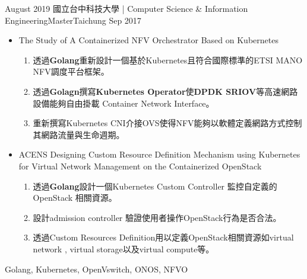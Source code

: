 %
%
%


\begin{experiences}
  \experience
    {August 2019}   {國立台中科技大學 | Computer Science \& Information Engineering}{Master}{Taichung}
    {Sep 2017} {
                      \begin{itemize}
                        \item The Study of A Containerized NFV Orchestrator Based on Kubernetes
                        \begin{enumerate}
                        	\item 透過\textbf{Golang}重新設計一個基於Kubernetes且符合國際標準的ETSI MANO NFV調度平台框架。 
                        	\item 透過\textbf{Golagn}撰寫\textbf{Kubernetes Operator}使\textbf{DPDK SRIOV}等高速網路設備能夠自由掛載 Container Network Interface。
                            \item 重新撰寫Kubernetes CNI介接OVS使得NFV能夠以軟體定義網路方式控制其網路流量與生命週期。
                        \end{enumerate}
                        \item ACENS Designing Custom Resource Definition Mechanism using Kubernetes for
Virtual Network Management on the Containerized OpenStack
                        \begin{enumerate}
                        	\item 透過\textbf{Golang}設計一個Kubernetes Custom Controller 監控自定義的OpenStack 相關資源。
                        	\item 設計admission controller 驗證使用者操作OpenStack行為是否合法。
                            \item 透過Custom Resources Definition用以定義OpenStack相關資源如virtual network , virtual storage以及virtual compute等。                            
                        \end{enumerate}
                      \end{itemize}
                    }
                    {Golang, Kubernetes, OpenVswitch, ONOS, NFVO}
  

\end{experiences}

